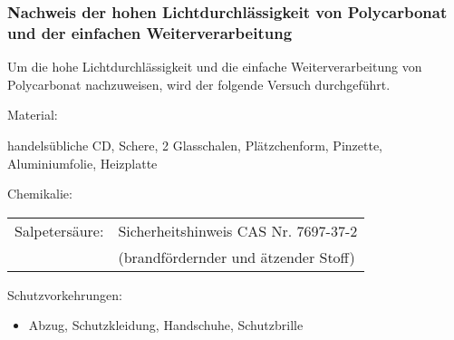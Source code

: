 \subsubsection{Nachweis der hohen Lichtdurchlässigkeit von Polycarbonat und der einfachen Weiterverarbeitung}

Um die hohe Lichtdurchlässigkeit und die einfache Weiterverarbeitung von
Polycarbonat nachzuweisen, wird der folgende Versuch durchgeführt.

\begin{itemize}
\end{itemize}

Material:
\begin{itemize*}
    \item handelsübliche CD, Schere, 2 Glasschalen, Plätzchenform, Pinzette, Aluminiumfolie, Heizplatte
    \item Chemikalie: \\
    \begin{xtabular}{ll}
    Salpetersäure: & Sicherheitshinweis CAS Nr. 7697-37-2 \\
    & (brandfördernder und ätzender Stoff) \\
    \end{xtabular}
\end{itemize*}

Schutzvorkehrungen:
\begin{itemize}
    \item Abzug, Schutzkleidung, Handschuhe, Schutzbrille
\end{itemize}

